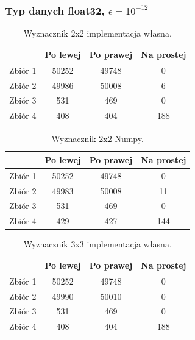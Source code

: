 \documentclass[11pt]{scrartcl}
\begin{document}
    \subsubsection{Typ danych float32, $\epsilon=10^{-12}$}
    \begin{table}[H]
        \centering
        \renewcommand{\arraystretch}{1.5}
        \begin{tabular}{| c | c | c | c |}
            \hline
            & Po lewej & Po prawej & Na prostej \\
            \hline
            Zbiór 1 & 50252 & 49748 & 0 \\
            \hline
            Zbiór 2 & 49986 & 50008 & 6 \\
            \hline
            Zbiór 3 & 531 & 469 & 0 \\
            \hline
            Zbiór 4 & 408 & 404 & 188 \\
            \hline
        \end{tabular}
        \renewcommand{\arraystretch}{1.5}
        \caption{Wyznacznik 2x2 implementacja własna.}
    \end{table}
    \begin{table}[H]
        \centering
        \renewcommand{\arraystretch}{1.5}
        \begin{tabular}{| c | c | c | c |}
            \hline
            & Po lewej & Po prawej & Na prostej \\
            \hline
            Zbiór 1 & 50252 & 49748 & 0 \\
            \hline
            Zbiór 2 & 49983 & 50008 & 11 \\
            \hline
            Zbiór 3 & 531 & 469 & 0 \\
            \hline
            Zbiór 4 & 429 & 427 & 144 \\
            \hline
        \end{tabular}
        \renewcommand{\arraystretch}{1.5}
        \caption{Wyznacznik 2x2 Numpy.}
    \end{table}
    \begin{table}[H]
        \centering
        \renewcommand{\arraystretch}{1.5}
        \begin{tabular}{| c | c | c | c |}
            \hline
            & Po lewej & Po prawej & Na prostej \\
            \hline
            Zbiór 1 & 50252 & 49748 & 0 \\
            \hline
            Zbiór 2 & 49990 & 50010 & 0 \\
            \hline
            Zbiór 3 & 531 & 469 & 0 \\
            \hline
            Zbiór 4 & 408 & 404 & 188 \\
            \hline
        \end{tabular}
        \renewcommand{\arraystretch}{1.5}
        \caption{Wyznacznik 3x3 implementacja własna.}
    \end{table}
\end{document}
